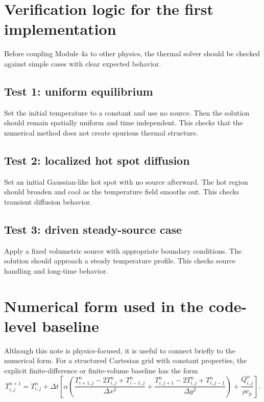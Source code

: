 \documentclass[11pt]{article}
\begin{document}
\section{Verification logic for the first implementation}

Before coupling Module 4a to other physics, the thermal solver should be checked against simple cases with clear expected behavior.

\subsection{Test 1: uniform equilibrium}

Set the initial temperature to a constant and use no source. Then the solution should remain spatially uniform and time independent. This checks that the numerical method does not create spurious thermal structure.

\subsection{Test 2: localized hot spot diffusion}

Set an initial Gaussian-like hot spot with no source afterward. The hot region should broaden and cool as the temperature field smooths out. This checks transient diffusion behavior.

\subsection{Test 3: driven steady-source case}

Apply a fixed volumetric source with appropriate boundary conditions. The solution should approach a steady temperature profile. This checks source handling and long-time behavior.

\section{Numerical form used in the code-level baseline}

Although this note is physics-focused, it is useful to connect briefly to the numerical form. For a structured Cartesian grid with constant properties, the explicit finite-difference or finite-volume baseline has the form
\begin{equation}
T_{i,j}^{n+1} = T_{i,j}^{n} + \Delta t \left[
\alpha \left(
\frac{T_{i+1,j}^{n}-2T_{i,j}^{n}+T_{i-1,j}^{n}}{\Delta x^2}
+
\frac{T_{i,j+1}^{n}-2T_{i,j}^{n}+T_{i,j-1}^{n}}{\Delta y^2}
\right)
+
\frac{Q_{i,j}^{n}}{\rho c_p}
\right].
\end{equation}
\end{document}

